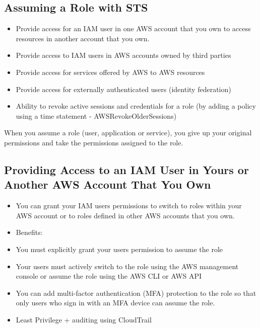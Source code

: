 \subsection{Assuming a Role with STS}
\begin{itemize}
    \item Provide access for an IAM user in one AWS account that you own to access resources in another account that you own.
    \item Provide access to IAM users in AWS accounts owned by third parties
    \item Provide access for services offered by AWS to AWS resources
    \item Provide access for externally authenticated users (identity federation)
    \item Ability to revoke active sessions and credentials for a role (by adding a policy using a time statement - AWSRevokeOlderSessions)
\end{itemize}

When you assume a role (user, application or service), you give up your original permissions and take the permissions assigned to the role.

\subsection{Providing Access to an IAM User in Yours or Another AWS Account That You Own}
\begin{itemize}
    \item You can grant your IAM users permissions to switch to roles within your AWS account or to roles defined in other AWS accounts that you own.
    \item Benefits:
    \item You must explicitly grant your users permission to assume the role
    \item Your users must actively switch to the role using the AWS management console or assume the role using the AWS CLI or AWS API
    \item You can add multi-factor authentication (MFA) protection to the role so that only users who sign in with an MFA device can assume the role.
    \item Least Privilege + auditing using CloudTrail
\end{itemize}

